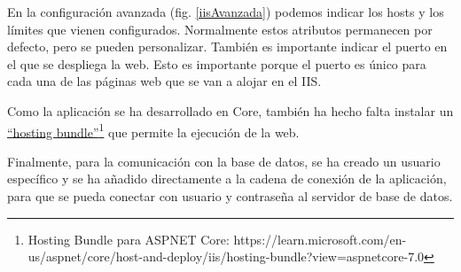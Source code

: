 En la configuración avanzada (fig. \ref{iisAvanzada}) podemos indicar los hosts y los límites que vienen configurados. Normalmente estos atributos permanecen por defecto, pero se pueden personalizar. También es importante indicar el puerto en el que se despliega la web. Esto es importante porque el puerto es único para cada una de las páginas web que se van a alojar en el IIS.

Como la aplicación se ha desarrollado en Core, también ha hecho falta instalar un \href{https://learn.microsoft.com/en-us/aspnet/core/host-and-deploy/iis/hosting-bundle?view=aspnetcore-7.0}{``hosting bundle''}\footnote{Hosting Bundle para ASPNET Core: https://learn.microsoft.com/en-us/aspnet/core/host-and-deploy/iis/hosting-bundle?view=aspnetcore-7.0} que permite la ejecución de la web.

Finalmente, para la comunicación con la base de datos, se ha creado un usuario específico y se ha añadido directamente a la cadena de conexión de la aplicación, para que se pueda conectar con usuario y contraseña al servidor de base de datos.